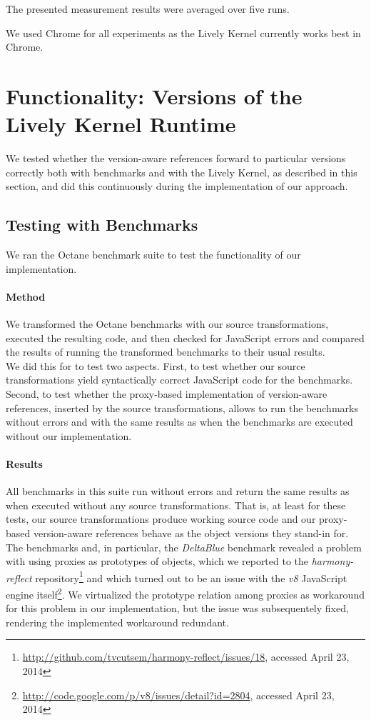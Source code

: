 The presented measurement results were averaged over five runs.

We used Chrome for all experiments as the Lively Kernel currently works best in Chrome.



\section{Functionality: Versions of the Lively Kernel Runtime} \label{sec:EVALUATION:2}

We tested whether the version-aware references forward to particular versions correctly both with benchmarks and with the Lively Kernel, as described in this section, and did this continuously during the implementation of our approach.

\subsection{Testing with Benchmarks}

We ran the Octane benchmark suite to test the functionality of our implementation.

\paragraph{Method}
We transformed the Octane benchmarks with our source transformations, executed the resulting code, and then checked for JavaScript errors and compared the results of running the transformed benchmarks to their usual results.\\
We did this for to test two aspects.
First, to test whether our source transformations yield syntactically correct JavaScript code for the benchmarks.
Second, to test whether the proxy-based implementation of version-aware references, inserted by the source transformations, allows to run the benchmarks without errors and with the same results as when the benchmarks are executed without our implementation.


\paragraph{Results}
All benchmarks in this suite run without errors and return the same results as when executed without any source transformations.
That is, at least for these tests, our source transformations produce working source code and our proxy-based version-aware references behave as the object versions they stand-in for.
The benchmarks and, in particular, the \emph{DeltaBlue} benchmark revealed a problem with using proxies as prototypes of objects, which we reported to the \emph{harmony-reflect} repository\footnote{\url{http://github.com/tvcutsem/harmony-reflect/issues/18}, accessed April 23, 2014} and which turned out to be an issue with the \emph{v8} JavaScript engine itself\footnote{\url{http://code.google.com/p/v8/issues/detail?id=2804}, accessed April 23, 2014}.
We virtualized the prototype relation among proxies as workaround for this problem in our implementation, but the issue was subsequentely fixed, rendering the implemented workaround redundant.

